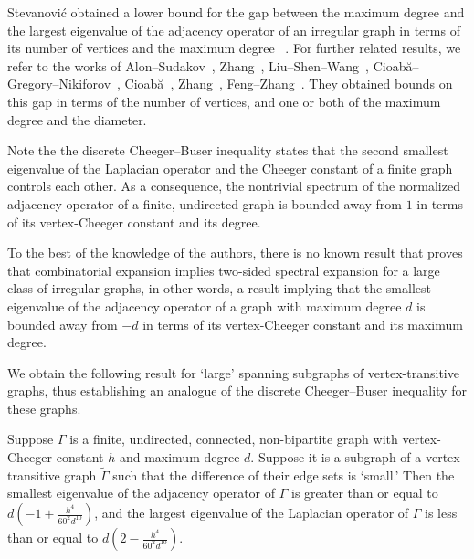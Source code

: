 Stevanovi\'{c} obtained a lower bound for the gap between the maximum degree and the largest eigenvalue of the adjacency operator of an irregular graph in terms of its number of vertices and the maximum degree ~\cite{StevanovicLargestEigenValueNonregGraphs}. 
For further related results, we refer to the works of 
Alon--Sudakov~\cite{AlonSudakovBipartiteSubgraphsSmallestEigenVal}, 
 Zhang~\cite{ZhangEigenVectEigenValNonRegGraph}, Liu--Shen--Wang~\cite{LiuShenWangLargestEigenValNonRegGraph}, Cioab\u{a}--Gregory--Nikiforov~\cite{CioabaGregoryNikiforovExtremeEigenvalNonRegGraph}, Cioab\u{a}~\cite{CioabaSpecRedMaxDegIrrGraphs}, Zhang~\cite{ZhangNewResultSpecRadiusIrregGraph}, Feng--Zhang~\cite{FengZhangNoteSpectralRadiusMaxDegreeIrreg}. They obtained bounds on this gap in terms of the number of vertices, and one or both of the maximum degree and the diameter. 

Note the the discrete Cheeger--Buser inequality states that the second smallest eigenvalue of the Laplacian operator and the Cheeger constant of a finite graph controls each other. As a consequence, the nontrivial spectrum of the normalized adjacency operator of a finite, undirected graph is bounded away from $1$ in terms of its vertex-Cheeger constant  and its degree. 

To the best of the knowledge of the authors, there is no known result that proves that combinatorial expansion implies two-sided spectral expansion for a large class of irregular graphs, in other words, a result implying that the smallest eigenvalue of the adjacency operator of a graph with maximum degree $d$ is bounded away from $-d$ in terms of its vertex-Cheeger constant and its maximum degree. 




We obtain the following result for `large' spanning subgraphs of vertex-transitive graphs, thus establishing an analogue of the discrete Cheeger--Buser inequality for these graphs.

\begin{theorem}
\label{Thm:IntroIrr}
Suppose $\Gamma$ is a finite, undirected, connected, non-bipartite graph with vertex-Cheeger constant $h$ and maximum degree $d$. Suppose it is a subgraph of a vertex-transitive graph $\widetilde \Gamma$ such that the difference of their edge sets is `small.' Then the smallest eigenvalue of the adjacency operator of $\Gamma$ is greater than or equal to $ d \left(-1 + \frac{h^4 }{60^2 d^{10}}\right)$, and the largest eigenvalue of the Laplacian operator of $\Gamma$ is less than or equal to $d \left(2 -  \frac{h^4 }{60^2 d^{10}}\right)$. 
\end{theorem}

